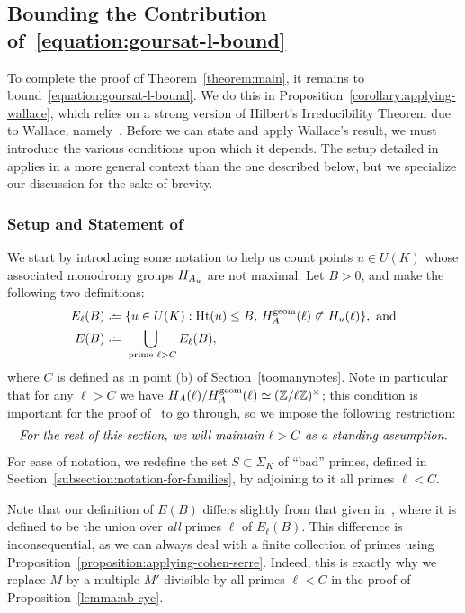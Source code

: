 \subsection{Bounding the Contribution of~\eqref{equation:goursat-l-bound}} \label{subsection:applying-wallace}
	
To complete the proof of Theorem~\ref{theorem:main}, it remains to bound~\eqref{equation:goursat-l-bound}. We do this in Proposition~\ref{corollary:applying-wallace}, which relies on a strong version of Hilbert's Irreducibility Theorem due to Wallace, namely~\cite[Theorem 3.9]{scoopdedoo}. Before we can state and apply Wallace's result, we must introduce the various conditions upon which it depends. The setup detailed in~\cite[Section 3.2]{scoopdedoo} applies in a more general context than the one described below, but we specialize our discussion for the sake of brevity.

\subsubsection{Setup and Statement of~\cite[Theorem 3.9]{scoopdedoo}}

We start by introducing some notation to help us count points $u \in U(K)$ whose associated monodromy groups $H_{A_u}$ are not maximal. Let $B > 0$, and make the following two definitions:
		\begin{align*}
		E_\ell(B) & \defeq \{u \in U(K) : \on{Ht}(u) \le B,\, H_A^{\on{geom}}(\ell) \not\subset H_u(\ell) \}, \text{ and}\\
		E(B) &\defeq \bigcup_{\text{ prime }\ell > C} E_{\ell}(B),
	\end{align*}
where $C$ is defined as in point (b) of Section~\ref{toomanynotes}.
Note in particular that for any $\ell > C$ we have $H_A(\ell) / H_A^{\operatorname{geom}}(\ell) \simeq (\mathbb Z/\ell \mathbb Z)^\times$; this condition is important for the proof of~\cite[Theorem 3.9]{scoopdedoo} to go through, so we impose the following restriction:
\vspace*{0.1cm}
\begin{align}\label{thatswhatpeoplesay}
\text{\emph{For the rest of this section, we will maintain $\ell > C$ as a standing assumption.}}
\end{align}
For ease of notation, we redefine the set $S \subset \Sigma_K$ of ``bad'' primes, defined in Section~\ref{subsection:notation-for-families}, by adjoining to it all primes $\ell < C$.

\begin{remark}\label{thanksdavide}
Note that our definition of $E(B)$ differs slightly from that given in~\cite[Theorem 1.1]{scoopdedoo}, where it is defined to be the union over \emph{all} primes $\ell$ of $E_{\ell}(B)$. This difference is inconsequential, as we can always deal with a finite collection of primes using Proposition~\ref{proposition:applying-cohen-serre}. Indeed, this is exactly why we replace $M$ by a multiple $M'$ divisible by all primes $\ell < C$ in the proof of Proposition~\ref{lemma:ab-cyc}.
\end{remark}

